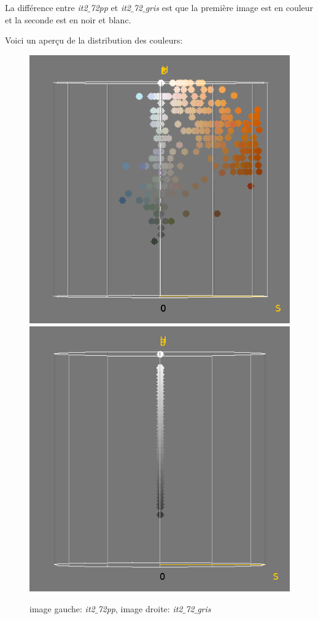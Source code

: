 \documentclass[a4paper,12pt]{report}
\begin{document}
La différence entre \textit{it2$\_$72pp} et \textit{it2$\_$72$\_$gris} est que la première image est en couleur et la seconde est en noir et blanc.

Voici un aperçu de la distribution des couleurs:

\begin{figure}[!ht]
	\center
	\includegraphics[scale=0.4]{image/E2q1-2.png}
	\includegraphics[scale=0.4]{image/E2q1-1.png}	
	\caption{image gauche: \textit{it2$\_$72pp}, image droite: \textit{it2$\_$72$\_$gris}}
\end{figure} 
\end{document}
